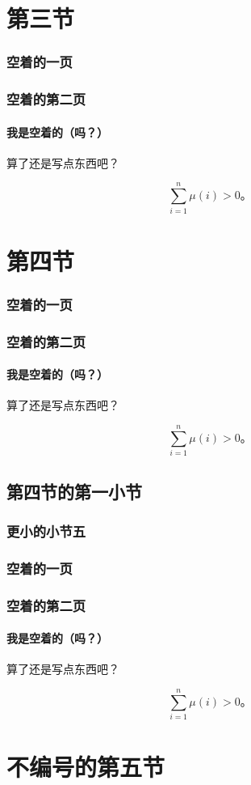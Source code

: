 \documentclass{../pkslide}
\begin{document}
\section{第三节}

\begin{frame}
  \frametitle{空着的一页}
\end{frame}

\begin{frame}
  \frametitle{空着的第二页}
  \framesubtitle{我是空着的（吗？）}
  
  算了还是写点东西吧？
  
  \[ \sum_{i = 1}^{n} \mu(i) > 0 \text{。} \]
\end{frame}

\section{第四节}

\begin{frame}
  \frametitle{空着的一页}
\end{frame}

\begin{frame}
  \frametitle{空着的第二页}
  \framesubtitle{我是空着的（吗？）}
  
  算了还是写点东西吧？
  
  \[ \sum_{i = 1}^{n} \mu(i) > 0 \text{。} \]
\end{frame}

\subsection{第四节的第一小节}
\subsubsection{更小的小节五}

\begin{frame}
  \frametitle{空着的一页}
\end{frame}

\begin{frame}
  \frametitle{空着的第二页}
  \framesubtitle{我是空着的（吗？）}
  
  算了还是写点东西吧？
  
  \[ \sum_{i = 1}^{n} \mu(i) > 0 \text{。} \]
\end{frame}

\section*{不编号的第五节}
\end{document}
